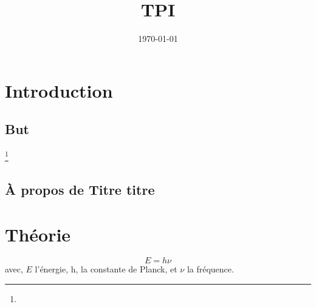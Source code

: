 \documentclass[11pt]{article} %
\title{\titlee \\ \normalcolor TPI}
\author{\auteur}
\date{\today}
\newcommand{\titlee}{\color{red}Titre titre}%
\begin{document}
	\bigskip
		\posttitle{\end{center}}
	
	\maketitle
	
	\newpage
\tableofcontents

\listoffigures

\pagebreak
\hypersetup{linkcolor=blue}
\section{Introduction}

\lipsum[1]

\subsection{But}

\lipsum[1]
\footnote{\lipsum[1][1]}

\subsection{À propos de \titlee}

\lipsum[1]


\section{Théorie}

\lipsum[1]
\begin{equation}
	E=h\nu
\end{equation}
avec, $E$ l'énergie, h, la constante de Planck, et $\nu$ la fréquence. 
\lipsum[2-3]
\end{document}
